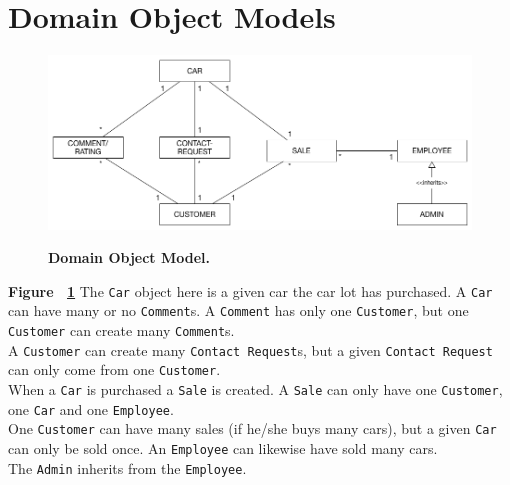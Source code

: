 \section{Domain Object Models}
\begin{figure}[h!]
	\centering
		\includegraphics[scale=0.35]{Figures/DomainObjectModel}\\
	\caption{\textbf{Domain Object Model.}}
  \label{fig:DomainObjectModel}
\end{figure}
\textbf{Figure ~\ref{fig:DomainObjectModel}}
The \texttt{Car} object here is a given car the car lot has purchased. A \texttt{Car} can have many or no \texttt{Comment}s. A  \texttt{Comment} has only one  \texttt{Customer}, but one  \texttt{Customer} can create many  \texttt{Comment}s.\\
A \texttt{Customer} can create many \texttt{Contact Request}s, but a given \texttt{Contact Request} can only come from one \texttt{Customer}.\\
When a  \texttt{Car} is purchased a \texttt{Sale} is created. A \texttt{Sale} can only have one \texttt{Customer}, one \texttt{Car} and one \texttt{Employee}.\\
One \texttt{Customer} can have many sales (if he/she buys many cars), but a given \texttt{Car} can only be sold once. An \texttt{Employee} can likewise have sold many cars.\\
The \texttt{Admin} inherits from the \texttt{Employee}.